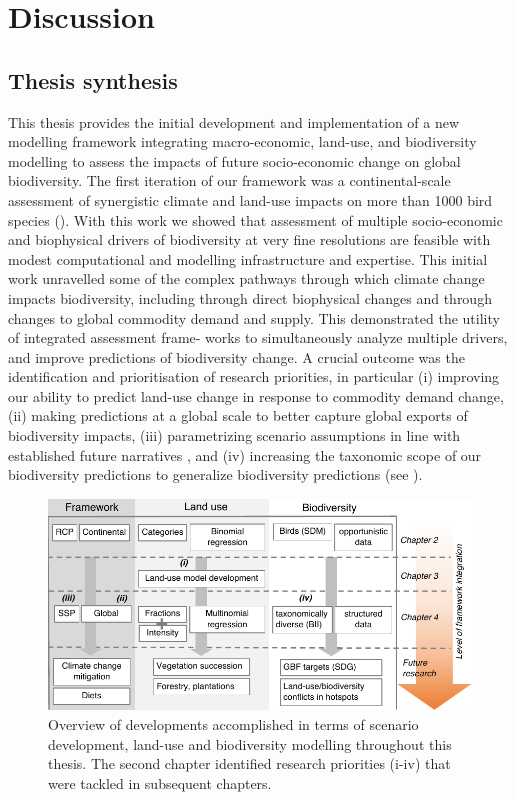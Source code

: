 \documentclass[titlesmallcaps,copyrightpage]{uomthesis}\usepackage[]{graphicx}\usepackage[]{color}
\begin{document}
\chapter{Discussion}\label{ch5}
\newpage

\section{Thesis synthesis}
This thesis provides the initial development and implementation of a new modelling framework integrating macro-economic, land-use, and biodiversity modelling to assess the impacts of future socio-economic change on global biodiversity.
The first iteration of our framework was a continental-scale assessment of synergistic climate and land-use impacts on more than 1000 bird species (). With this work we showed that assessment of multiple socio-economic and biophysical drivers of biodiversity at very fine resolutions are feasible with modest computational and modelling infrastructure and expertise. This initial work unravelled some of the complex pathways through which climate change impacts biodiversity, including through direct biophysical changes and through changes to global commodity demand and supply. This demonstrated the utility of integrated assessment frame- works to simultaneously analyze multiple drivers, and improve predictions of biodiversity change. A crucial outcome was the identification and prioritisation of research priorities, in particular (i) improving our ability to predict land-use change in response to commodity demand change, (ii) making predictions at a global scale to better capture global exports of biodiversity impacts, (iii) parametrizing scenario assumptions in line with established future narratives \citep[the so-called ‘shared socio-economic pathways’,][]{oneill_new_2014}, and (iv) increasing the taxonomic scope of our biodiversity predictions to generalize biodiversity predictions (see ).


\begin{figure}[htb]
\centering
\includegraphics{chapters/figures/chapter5/fig1.pdf} 
\caption{Overview of developments accomplished in terms of scenario development, land-use and biodiversity modelling throughout this thesis. The second chapter identified research priorities (i-iv) that were tackled in subsequent chapters.}
\label{ch5:fig1}
\end{figure}
\end{document}
